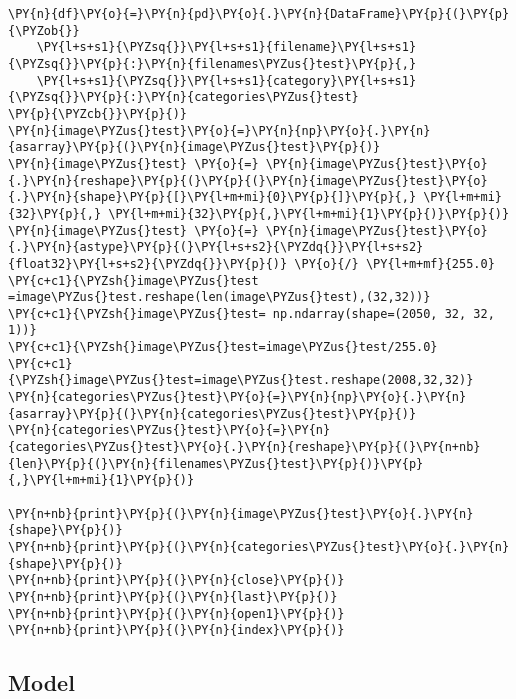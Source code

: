 \begin{tcolorbox}[breakable, size=fbox, boxrule=1pt, pad at break*=1mm,colback=cellbackground, colframe=cellborder]
\begin{Verbatim}[commandchars=\\\{\}]
\PY{n}{df}\PY{o}{=}\PY{n}{pd}\PY{o}{.}\PY{n}{DataFrame}\PY{p}{(}\PY{p}{\PYZob{}}
    \PY{l+s+s1}{\PYZsq{}}\PY{l+s+s1}{filename}\PY{l+s+s1}{\PYZsq{}}\PY{p}{:}\PY{n}{filenames\PYZus{}test}\PY{p}{,}
    \PY{l+s+s1}{\PYZsq{}}\PY{l+s+s1}{category}\PY{l+s+s1}{\PYZsq{}}\PY{p}{:}\PY{n}{categories\PYZus{}test}
\PY{p}{\PYZcb{}}\PY{p}{)}
\PY{n}{image\PYZus{}test}\PY{o}{=}\PY{n}{np}\PY{o}{.}\PY{n}{asarray}\PY{p}{(}\PY{n}{image\PYZus{}test}\PY{p}{)}
\PY{n}{image\PYZus{}test} \PY{o}{=} \PY{n}{image\PYZus{}test}\PY{o}{.}\PY{n}{reshape}\PY{p}{(}\PY{p}{(}\PY{n}{image\PYZus{}test}\PY{o}{.}\PY{n}{shape}\PY{p}{[}\PY{l+m+mi}{0}\PY{p}{]}\PY{p}{,} \PY{l+m+mi}{32}\PY{p}{,} \PY{l+m+mi}{32}\PY{p}{,}\PY{l+m+mi}{1}\PY{p}{)}\PY{p}{)}
\PY{n}{image\PYZus{}test} \PY{o}{=} \PY{n}{image\PYZus{}test}\PY{o}{.}\PY{n}{astype}\PY{p}{(}\PY{l+s+s2}{\PYZdq{}}\PY{l+s+s2}{float32}\PY{l+s+s2}{\PYZdq{}}\PY{p}{)} \PY{o}{/} \PY{l+m+mf}{255.0}
\PY{c+c1}{\PYZsh{}image\PYZus{}test =image\PYZus{}test.reshape(len(image\PYZus{}test),(32,32))}
\PY{c+c1}{\PYZsh{}image\PYZus{}test= np.ndarray(shape=(2050, 32, 32, 1))}
\PY{c+c1}{\PYZsh{}image\PYZus{}test=image\PYZus{}test/255.0}
\PY{c+c1}{\PYZsh{}image\PYZus{}test=image\PYZus{}test.reshape(2008,32,32)}
\PY{n}{categories\PYZus{}test}\PY{o}{=}\PY{n}{np}\PY{o}{.}\PY{n}{asarray}\PY{p}{(}\PY{n}{categories\PYZus{}test}\PY{p}{)}
\PY{n}{categories\PYZus{}test}\PY{o}{=}\PY{n}{categories\PYZus{}test}\PY{o}{.}\PY{n}{reshape}\PY{p}{(}\PY{n+nb}{len}\PY{p}{(}\PY{n}{filenames\PYZus{}test}\PY{p}{)}\PY{p}{,}\PY{l+m+mi}{1}\PY{p}{)}

\PY{n+nb}{print}\PY{p}{(}\PY{n}{image\PYZus{}test}\PY{o}{.}\PY{n}{shape}\PY{p}{)}
\PY{n+nb}{print}\PY{p}{(}\PY{n}{categories\PYZus{}test}\PY{o}{.}\PY{n}{shape}\PY{p}{)}
\PY{n+nb}{print}\PY{p}{(}\PY{n}{close}\PY{p}{)}
\PY{n+nb}{print}\PY{p}{(}\PY{n}{last}\PY{p}{)}
\PY{n+nb}{print}\PY{p}{(}\PY{n}{open1}\PY{p}{)}
\PY{n+nb}{print}\PY{p}{(}\PY{n}{index}\PY{p}{)}
\end{Verbatim}
\end{tcolorbox}

\subsection{Model \cite{keras}}

